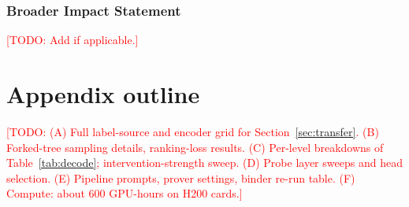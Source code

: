 \documentclass[10pt]{article}
\newcommand{\todo}[1]{\textcolor{red}{[TODO: #1]}}
\begin{document}
\subsubsection*{Broader Impact Statement}
\todo{Add if applicable.}




\appendix
\section{Appendix outline}
\todo{(A) Full label-source and encoder grid for Section~\ref{sec:transfer}. (B) Forked-tree sampling details, ranking-loss results. (C) Per-level breakdowns of Table~\ref{tab:decode}; intervention-strength sweep. (D) Probe layer sweeps and head selection. (E) Pipeline prompts, prover settings, binder re-run table. (F) Compute: about 600 GPU-hours on H200 cards.}
\end{document}
